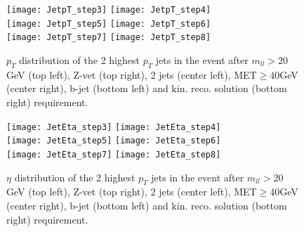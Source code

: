 \clearpage
\newpage





\begin{figure}
  \texttt{[image: JetpT\_step3]}
  \texttt{[image: JetpT\_step4]}\\
  \texttt{[image: JetpT\_step5]}
  \texttt{[image: JetpT\_step6]}\\
  \texttt{[image: JetpT\_step7]}
  \texttt{[image: JetpT\_step8]}
\caption{$p_T$ distribution of the 2 highest $p_T$ jets in the event after $m_{ll}>20$ GeV (top left), Z-vet (top right), 2 jets (center left), MET$\geq40$GeV (center right), b-jet (bottom left) and kin. reco. solution (bottom right) requirement.}
\end{figure}

\clearpage
\newpage






\begin{figure}
  \texttt{[image: JetEta\_step3]}
  \texttt{[image: JetEta\_step4]}\\
  \texttt{[image: JetEta\_step5]}
  \texttt{[image: JetEta\_step6]}\\
  \texttt{[image: JetEta\_step7]}
  \texttt{[image: JetEta\_step8]}
\caption{$\eta$ distribution of the 2 highest $p_T$ jets in the event after $m_{ll}>20$ GeV (top left), Z-vet (top right), 2 jets (center left), MET$\geq40$GeV (center right), b-jet (bottom left) and kin. reco. solution (bottom right) requirement.}
\end{figure}

\clearpage
\newpage
